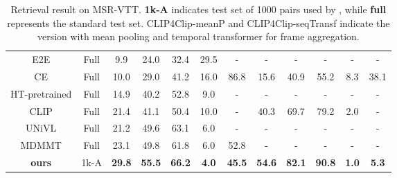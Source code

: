 \documentclass[final]{cvpr}
\begin{document}
\begin{table*}[t]
\begin{center}
{\begin{tabular}{c|c|ccccc|ccccc}
	    E2E \cite{miech2020end}                 & Full & 9.9  & 24.0 & 32.4 & 29.5 & -    & -    &    - & -    &   - & - \\
	    CE \cite{liu2019use}                    & Full & 10.0 & 29.0 & 41.2 & 16.0 & 86.8 & 15.6 & 40.9 & 55.2 & 8.3 & 38.1 \\
	    HT-pretrained \cite{miech2019howto100m} & Full & 14.9 & 40.2 & 52.8 & 9.0  & -    & -    &    - & -    &   - & - \\
	    CLIP \cite{portillo2021straightforward} & Full & 21.4 & 41.1 & 50.4 & 10.0 & -    & 40.3 & 69.7 & 79.2 & 2.0 & - \\
	    UNiVL \cite{luo2020univilm}             & Full & 21.2 & 49.6 & 63.1 & 6.0  & -    & -    &    - & -    &   - & - \\	
	    MDMMT \cite{dzabraev2021mdmmt}          & Full & 23.1 & 49.8 & 61.8	& 6.0  & 52.8 & -    &    - & -    &   - & - \\
	    \hline
	    \textbf{ours}  & 1k-A & \textbf{29.8} & \textbf{55.5} & \textbf{66.2} & \textbf{4.0}  & \textbf{45.5} & \textbf{54.6} & \textbf{82.1} & \textbf{90.8} & \textbf{1.0} & \textbf{5.3} \\
    	\hline
		\end{tabular}}
	\end{center}
	\vspace{-0.2 cm}
	\caption{Retrieval result on MSR-VTT. \textbf{1k-A} indicates test set of 1000 pairs used by \cite{yu2018joint}, while \textbf{full} represents the standard test set. CLIP4Clip-meanP and CLIP4Clip-seqTransf indicate the version with mean pooling and temporal transformer for frame aggregation.}
	\label{MSRVTTTable}
\end{table*}
\end{document}
